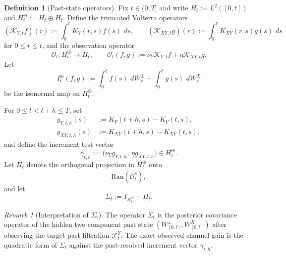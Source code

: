 \documentclass[11pt,a4paper]{amsart}
\theoremstyle{plain}
\theoremstyle{definition}
\newtheorem{definition}[theorem]{Definition}
\theoremstyle{remark}
\newtheorem{remark}[theorem]{Remark}
\newcommand{\dd}{\,d}
\begin{document}
\begin{definition}[Past-state operators]\label{def:operators}
Fix $t\in(0,T]$ and write $H_t:=L^2([0,t])$ and $H_t^\oplus:=H_t\oplus H_t$.
Define the truncated Volterra operators
\[
(\mathcal K_{Y,t}f)(r):=\int_0^r K_Y(r,s)f(s)\,\dd s,
\qquad
(\mathcal K_{XY,t}g)(r):=\int_0^r K_{XY}(r,s)g(s)\,\dd s
\]
for $0\le r\le t$, and the observation operator
\begin{equation}\label{eq:Ot}
\mathcal O_t:H_t^\oplus\to H_t,
\qquad
\mathcal O_t(f,g):=\nu_Y\mathcal K_{Y,t}f+\eta\mathcal K_{XY,t}g.
\end{equation}
Let
\[
I_t^\oplus(f,g):=\int_0^t f(s)\,\dd W_s^\perp+\int_0^t g(s)\,\dd W_s^X
\]
be the isonormal map on $H_t^\oplus$.

For $0\le t<t+h\le T$, set
\begin{align}
g_{Y,t,h}(s)&:=K_Y(t+h,s)-K_Y(t,s), \label{eq:gY}\\
g_{XY,t,h}(s)&:=K_{XY}(t+h,s)-K_{XY}(t,s), \label{eq:gXY}
\end{align}
and define the increment test vector
\begin{equation}\label{eq:gamma}
\gamma_{t,h}:=\bigl(\nu_Y g_{Y,t,h},\, \eta g_{XY,t,h}\bigr)\in H_t^\oplus.
\end{equation}
Let $\Pi_t$ denote the orthogonal projection in $H_t^\oplus$ onto
\[
\overline{\mathrm{Ran}(\mathcal O_t^*)},
\]
and let
\begin{equation}\label{eq:Sigma}
\Sigma_t:=I_{H_t^\oplus}-\Pi_t.
\end{equation}
\end{definition}

\begin{remark}[Interpretation of $\Sigma_t$]
The operator $\Sigma_t$ is the posterior covariance operator of the hidden two-component past state
\((W^\perp_{[0,t]},W^X_{[0,t]})\) after observing the target past filtration $\mathcal F_t^Y$.
The exact observed-channel gain is the quadratic form of $\Sigma_t$ against the past-resolved
increment vector $\gamma_{t,h}$.
\end{remark}
\end{document}
